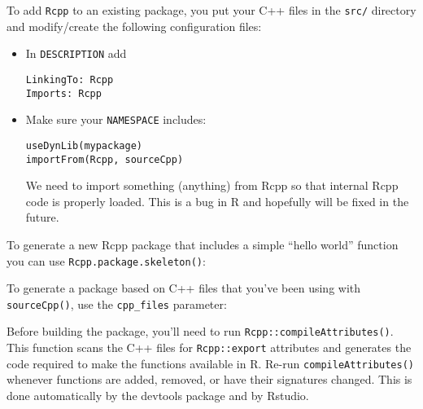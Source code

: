 To add \texttt{Rcpp} to an existing package, you put your C++ files in
the \texttt{src/} directory and modify/create the following
configuration files:

\begin{itemize}
\item
  In \texttt{DESCRIPTION} add

\begin{verbatim}
LinkingTo: Rcpp
Imports: Rcpp
\end{verbatim}
\item
  Make sure your \texttt{NAMESPACE} includes:

\begin{verbatim}
useDynLib(mypackage)
importFrom(Rcpp, sourceCpp)
\end{verbatim}

  We need to import something (anything) from Rcpp so that internal Rcpp
  code is properly loaded. This is a bug in R and hopefully will be
  fixed in the future.
\end{itemize}

To generate a new Rcpp package that includes a simple ``hello world''
function you can use \texttt{Rcpp.package.skeleton()}:

\begin{Shaded}
\begin{Highlighting}[]
\NormalTok{(}\NormalTok{, } \NormalTok{)}
\end{Highlighting}
\end{Shaded}

To generate a package based on C++ files that you've been using with
\texttt{sourceCpp()}, use the \texttt{cpp\_files} parameter:

\begin{Shaded}
\begin{Highlighting}[]
\NormalTok{(}\NormalTok{, } \NormalTok{,}
                       \NormalTok{(}\NormalTok{))}
\end{Highlighting}
\end{Shaded}

Before building the package, you'll need to run
\texttt{Rcpp::compileAttributes()}. This function scans the C++ files
for \texttt{Rcpp::export} attributes and generates the code required to
make the functions available in R. Re-run \texttt{compileAttributes()}
whenever functions are added, removed, or have their signatures changed.
This is done automatically by the devtools package and by Rstudio.


